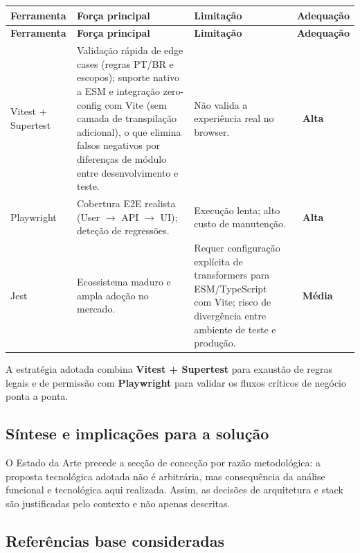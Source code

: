 \documentclass[11pt,a4paper,twoside]{article}
\newcommand{\tagn}[1]{{\setlength{\fboxsep}{1.5pt}\colorbox{TAGNEUTRAL}{\scriptsize\sffamily\bfseries\color{white}~#1~}}}
\newcommand{\tH}[1]{\textbf{\sffamily\small\color{white}#1}}
\newcommand{\theadrow}{\rowcolor{ACCENT}}
\begin{document}
\begin{longtable}{>{\small\bfseries}p{2.4cm} >{\small\raggedright\arraybackslash}p{4.4cm} >{\small\raggedright\arraybackslash}p{3.8cm} >{\small\centering\arraybackslash}p{3.2cm}}
\theadrow
\tH{Ferramenta} & \tH{Força principal} & \tH{Limitação} & \tH{Adequação} \\
\midrule
\endfirsthead
\theadrow
\tH{Ferramenta} & \tH{Força principal} & \tH{Limitação} & \tH{Adequação} \\
\midrule
\endhead

Vitest + Supertest & Validação rápida de edge cases (regras PT/BR e escopos); suporte nativo a ESM e integração zero-config com Vite (sem camada de transpilação adicional), o que elimina falsos negativos por diferenças de módulo entre desenvolvimento e teste. & Não valida a experiência real no browser. & \tagn{Alta} \\ \addlinespace[4pt]

Playwright & Cobertura E2E realista (User $\to$ API $\to$ UI); deteção de regressões. & Execução lenta; alto custo de manutenção. & \tagn{Alta} \\ \addlinespace[4pt]

Jest & Ecossistema maduro e ampla adoção no mercado. & Requer configuração explícita de transformers para ESM/TypeScript com Vite; risco de divergência entre ambiente de teste e produção. & \tagn{Média} \\
\bottomrule
\end{longtable}

\begin{note}
A estratégia adotada combina \textbf{Vitest + Supertest} para exaustão de regras legais e de permissão com \textbf{Playwright} para validar os fluxos críticos de negócio ponta a ponta.
\end{note}

\subsection{Síntese e implicações para a solução}

O Estado da Arte precede a secção de conceção por razão metodológica: a proposta tecnológica adotada não é arbitrária, mas consequência da análise funcional e tecnológica aqui realizada. Assim, as decisões de arquitetura e stack são justificadas pelo contexto e não apenas descritas.

\subsection{Referências base consideradas}
\end{document}
